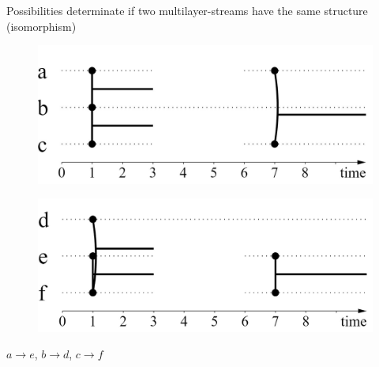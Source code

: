 \documentclass[15pt]{beamer}
\begin{document}
\begin{frame}{Possibilities}%
    determinate if two multilayer-streams have the same structure (isomorphism)
    
	\begin{minipage}{0.4\linewidth}
		\begin{figure}
			\centering
			\includegraphics[width=\linewidth]{img/iso1.jpg}
			\label{iso1}
		\end{figure}
	\end{minipage}
	\begin{minipage}{0.4\linewidth}
		\begin{figure}
			\centering
			\includegraphics[width=\linewidth]{img/iso2.jpg}
			\label{iso2}
		\end{figure}
	\end{minipage} \pause
	
	$a \rightarrow e $, $b \rightarrow d$, $c \rightarrow f$
    \pause
    

\end{frame}
\end{document}
